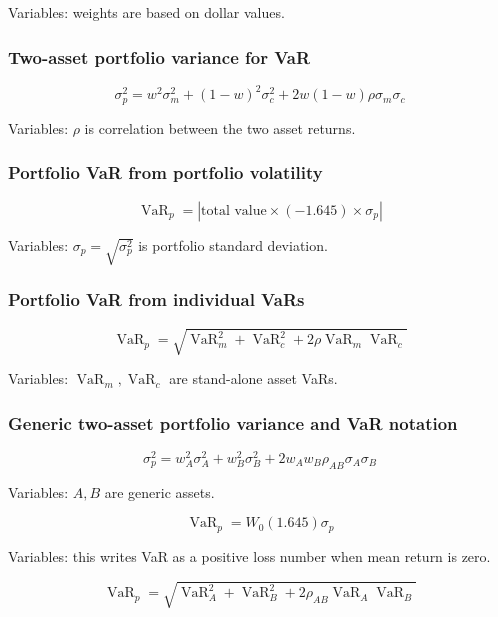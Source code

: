 \documentclass[
  8pt,
  twocolumn]{extarticle}
\begin{document}
Variables: weights are based on dollar values.

\subsubsection{Two-asset portfolio variance for
VaR}\label{two-asset-portfolio-variance-for-var}

\[
\sigma_p^2=w^2\sigma_m^2+(1-w)^2\sigma_c^2+2w(1-w)\rho\sigma_m\sigma_c
\]

Variables: \(\rho\) is correlation between the two asset returns.

\subsubsection{Portfolio VaR from portfolio
volatility}\label{portfolio-var-from-portfolio-volatility}

\[
\operatorname{VaR}_p=\left|\text{total value}\times(-1.645)\times\sigma_p\right|
\]

Variables: \(\sigma_p=\sqrt{\sigma_p^2}\) is portfolio standard
deviation.

\subsubsection{Portfolio VaR from individual
VaRs}\label{portfolio-var-from-individual-vars}

\[
\operatorname{VaR}_p=\sqrt{\operatorname{VaR}_m^2+\operatorname{VaR}_c^2+2\rho\operatorname{VaR}_m\operatorname{VaR}_c}
\]

Variables: \(\operatorname{VaR}_m,\operatorname{VaR}_c\) are stand-alone
asset VaRs.

\subsubsection{Generic two-asset portfolio variance and VaR
notation}\label{generic-two-asset-portfolio-variance-and-var-notation}

\[
\sigma_p^2=w_A^2\sigma_A^2+w_B^2\sigma_B^2+2w_Aw_B\rho_{AB}\sigma_A\sigma_B
\]

Variables: \(A,B\) are generic assets.

\[
\operatorname{VaR}_p=W_0(1.645)\sigma_p
\]

Variables: this writes VaR as a positive loss number when mean return is
zero.

\[
\operatorname{VaR}_p=\sqrt{\operatorname{VaR}_A^2+\operatorname{VaR}_B^2+2\rho_{AB}\operatorname{VaR}_A\operatorname{VaR}_B}
\]
\end{document}
